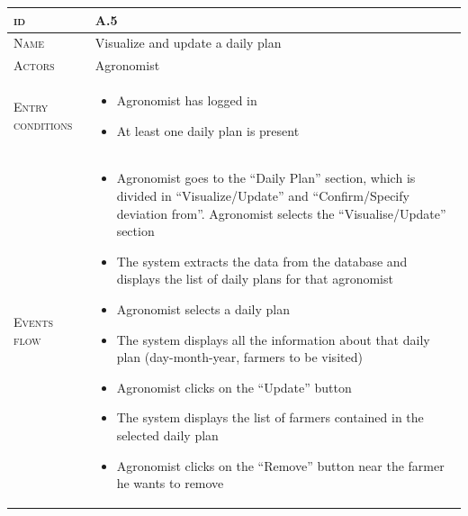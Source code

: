 \begin{table}[H]
    \centering
    \begin{tabular}[c]{|l|p{}|}
        \hline %
    	\textsc{id}                 &   A.5\\
    	\hline %
    	\textsc{Name}               &   Visualize and update a daily plan\\
    	\hline %
    	\textsc{Actors}             &   Agronomist\\
    	\hline %
    	\textsc{Entry conditions}   &   \begin{itemize}
                                    	    \item Agronomist has logged in
                                    	    \item At least one daily plan is present
                                        \end{itemize}\\
    	\hline %
    	\textsc{Events flow}         &   %
            	                        \begin{itemize}
                                    	    \item Agronomist goes to the “Daily Plan” section, which is divided in “Visualize/Update” and “Confirm/Specify deviation from”. Agronomist selects the “Visualise/Update” section
                                    		\item The system extracts the data from the database and displays the list of daily plans for that agronomist
                                    		\item Agronomist selects a daily plan
                                    		\item The system displays all the information about that daily plan (day-month-year, farmers to be visited)
                                    		\item Agronomist clicks on the “Update” button
                                    		\item The system displays the list of farmers contained in the selected daily plan
                                    		\item Agronomist clicks on the “Remove” button near the farmer he wants to remove

\end{itemize}
\end{tabular}
\end{table}
